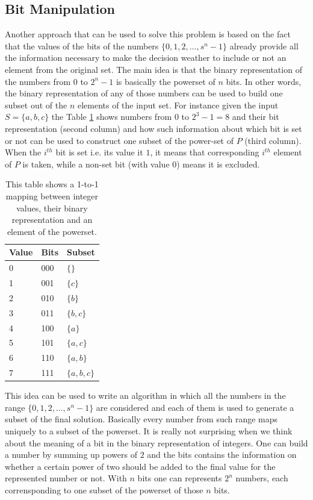 \subsection{Bit Manipulation}
Another approach that can be used to solve this problem is based on the fact that the values of the
bits of the numbers $\{0,1,2,\ldots, s^n-1\}$  already provide all the information necessary to make
the decision weather to include or not an element from the original set. 
The main idea is that the binary representation of the numbers from $0$ to $2^{n}-1$ is basically
the powerset of $n$ bits.
In other words, the binary representation of any of those numbers can be used to build one subset out
of the $n$ elements of the input set. 
For instance given the input $S=\{a,b,c\}$ the Table \ref{tab:mapping_value_bits} shows numbers from $0$ to $2^3-1 = 8$ and their bit
representation (second column) and how such information about which bit is set or not can be used to construct one
subset of the power-set of $P$ (third column). When the $i^{th}$ bit is set i.e. its value it $1$, it means that
corresponding $i^{th}$ element of $P$ is taken, while a non-set bit (with value $0$) means it is
excluded.

\begin{table}
	\centering
	\begin{tabular}{|l|l|l|}
		\hline
		Value & Bits & Subset\\ \hline
		0     & 000  & $\{\}$\\ \hline
		1     & 001  & $\{c\}$\\ \hline
		2     & 010  & $\{b\}$\\ \hline
		3     & 011  & $\{b,c\}$\\ \hline
		4     & 100  & $\{a\}$\\ \hline
		5     & 101  & $\{a,c\}$\\ \hline
		6     & 110  & $\{a,b\}$\\ \hline
		7     & 111  & $\{a,b,c\}$ \\ \hline
	\end{tabular}
	\caption[Mapping between bits and element of the powerset.]{This table shows a 1-to-1 mapping between integer values, their binary representation and an element of the powerset.}
	\label{tab:mapping_value_bits}
\end{table}

This idea can be used to write an algorithm in which all the numbers in the range $\{0,1,2,\ldots,
s^n-1\}$ are considered and each of them is used to generate a subset of the final solution.
Basically every number from such range maps uniquely to a subset of the powerset. It is really not
surprising when we think about the meaning of a bit in the binary representation of integers. One
can build a number by summing up powers of $2$ and the bits contains the information on whether a
certain power of two should be added to the final value for the represented number or not. With $n$
bits one can represents $2^n$ numbers, each corrensponding to one subset of the powerset of those
$n$ bits.

